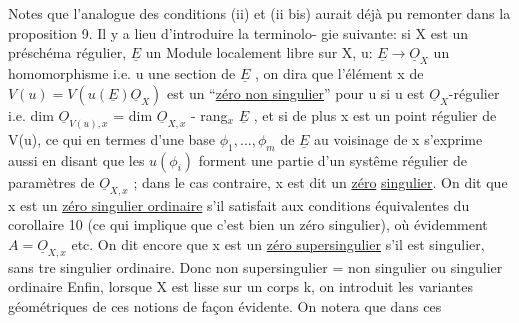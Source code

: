 



Notes que l'analogue des conditions (ii) et (ii bis) aurait déjà
pu remonter dans la proposition 9. Il y a lieu d'introduire la terminolo-%
gie suivante: si X est un préschéma régulier, $\underline{E}$ un Module localement libre
 sur X, u: $\underline{E}\to\underline{O}_X$ un homomorphisme i.e. u une section de
$\underline{E}$\hand{$^\vee$} , on dira que l'élément x de $V(u)=V(u(\underline{E})\underline{O}_X)$ est un 
``\uline{zéro non singulier}'' pour u\hand{,} si u est $\underline{O}_X$-régulier i.e. dim $\underline{O}_{V(u),x}$
= dim $\underline{O}_{X,x}$ - rang$_x$ $\underline{E}$ , et si de plus x est un point régulier de V(u),
ce qui en termes d'une base $\phi_1,\ldots,\phi_m$ de $\underline{E}$ au voisinage de x s'exprime
aussi en disant que les $u(\phi_i)$ forment une partie d'un systême régulier
de paramètres de $\underline{O}_{X,x}$ ; dans le cas contraire, x est dit un \uline{zéro}
\uline{singulier}. On dit que x est un \uline{zéro singulier ordinaire} s'il satisfait
aux conditions équivalentes du corollaire 10 (ce qui implique que c'est
bien un zéro singulier), où évidemment $A=\underline{O}_{X,x}$ etc. On dit encore que
x est un \uline{zéro supersingulier} s'il est singulier, sans tre singulier
ordinaire. Donc non supersingulier = non singulier ou singulier ordinaire
Enfin, lorsque X est lisse sur un corps k, on introduit les variantes
géométriques de ces notions de façon évidente. On notera que dans ces


